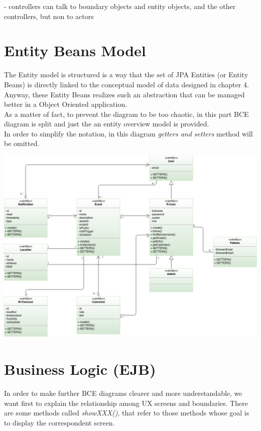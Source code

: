 \documentclass[12pt]{book}
\begin{document}
- controllers can talk to boundary objects and entity objects, and the other controllers, but non to actors\\

\section{Entity Beans Model}
The Entity model is structured is a way that the set of JPA Entities (or Entity Beans) is directly linked to the conceptual model of data designed in chapter 4. \\
Anyway, these Entity Beans realizes such an abstraction that can be managed better in a Object Oriented application.  \\
As a matter of fact, to prevent the diagram to be too chaotic, in this part BCE diagram is split and just the an entity overview model is provided. \\
In order to simplify the notation, in this diagram \textit{getters and setters} method will be omitted.\\

\vspace{2cm}
\begin{center}
\includegraphics[scale=0.45]{entity}\\
\end{center}
\newpage
\section{Business Logic (EJB)}

In order to make further BCE diagrams clearer and more understandable, we want first to explain the relationship among UX screens and boundaries. There are some methods called \textit{showXXX()}, that refer to those methods whose goal is to display the correspondent screen. \\
\vspace{2cm}
\end{document}
